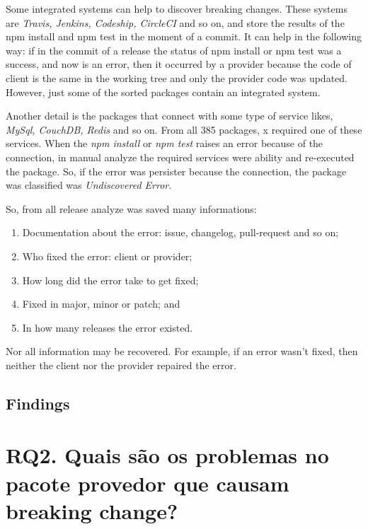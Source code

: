 Some integrated systems can help to discover breaking changes. These systems are \textit{Travis, Jenkins, Codeship, CircleCI} and so on, and store the results of the npm install and npm test in the moment of a commit. It can help in the following way: if in the commit of a release the status of npm install or npm test was a success, and now is an error, then it occurred by a provider because the code of client is the same in the working tree and only the provider code was updated. However, just some of the sorted packages contain an integrated system.

Another detail is the packages that connect with some type of service likes, \textit{MySql, CouchDB, Redis} and so on. From all 385 packages, x required one of these services. When the \textit{npm install} or \textit{npm test} raises an error because of the connection, in manual analyze the required services were ability and re-executed the package. So, if the error was persister because the connection, the package was classified was \textit{Undiscovered Error}.

So, from all release analyze was saved many informations:

\begin{enumerate}
    \item Documentation about the error: issue, changelog, pull-request and so on;
    \item Who fixed the error: client or provider;
    \item How long did the error take to get fixed;
    \item Fixed in major, minor or patch; and
    \item In how many releases the error existed.
\end{enumerate}{}

Nor all information may be recovered. For example, if an error wasn't fixed, then neither the client nor the provider repaired the error.

\subsection{Findings}
\label{fin:rq1}

\section{RQ2. Quais são os problemas no pacote provedor que causam breaking change?}
\label{sec:rq2}

